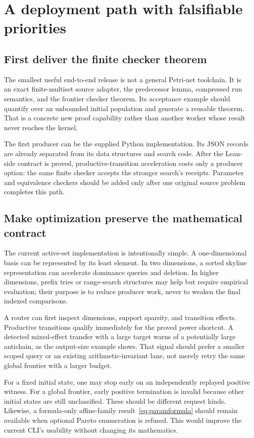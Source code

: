 \documentclass[11pt,a4paper]{article}
\theoremstyle{definition}
\theoremstyle{remark}
\begin{document}
\section{A deployment path with falsifiable priorities}\label{sec:deployment}
\subsection{First deliver the finite checker theorem}
The smallest useful end-to-end release is not a general Petri-net toolchain. It is an exact finite-multiset source adapter, the predecessor lemma, compressed run semantics, and the frontier checker theorem. Its acceptance example should quantify over an unbounded initial population and generate a reusable theorem. That is a concrete new proof capability rather than another worker whose result never reaches the kernel.

The first producer can be the supplied Python implementation. Its JSON records are already separated from its data structures and search code. After the Lean-side contract is proved, productive-transition acceleration costs only a producer option: the same finite checker accepts the stronger search's receipts. Parameter and equivalence checkers should be added only after one original source problem completes this path.

\subsection{Make optimization preserve the mathematical contract}
The current active-set implementation is intentionally simple. A one-dimensional basis can be represented by its least element. In two dimensions, a sorted skyline representation can accelerate dominance queries and deletion. In higher dimensions, prefix tries or range-search structures may help but require empirical evaluation; their purpose is to reduce producer work, never to weaken the final indexed comparisons.

A router can first inspect dimensions, support sparsity, and transition effects. Productive transitions qualify immediately for the proved power shortcut. A detected mixed-effect transfer with a large target warns of a potentially large antichain, as the output-size example shows. That signal should prefer a smaller scoped query or an existing arithmetic-invariant lane, not merely retry the same global frontier with a larger budget.

For a fixed initial state, one may stop early on an independently replayed positive witness. For a global frontier, early positive termination is invalid because other initial states are still unclassified. These should be different request kinds. Likewise, a formula-only affine-family result~\eqref{eq:paramformula} should remain available when optional Pareto enumeration is refused. This would improve the current CLI's usability without changing its mathematics.
\end{document}
